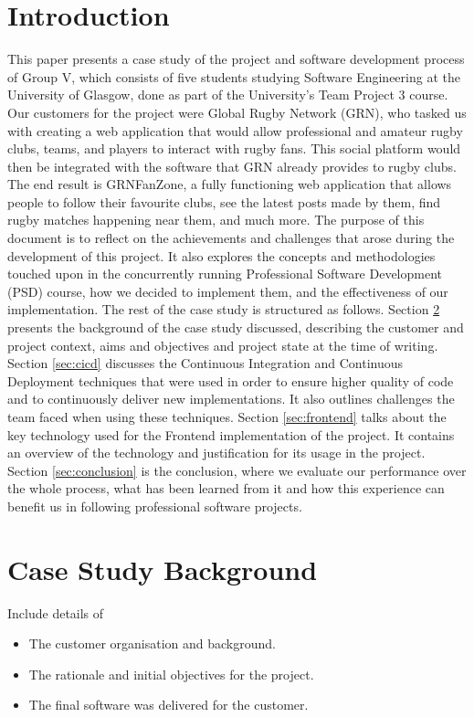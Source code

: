 \documentclass{l3proj}
\begin{document}
\section{Introduction}
This paper presents a case study of the project and software development process of Group V, which consists of five students studying Software Engineering at the University of Glasgow, done as part of the University's Team Project 3 course.
Our customers for the project were Global Rugby Network (GRN), who tasked us with creating a web application that would allow professional and amateur rugby clubs, teams, and players to interact with rugby fans. This social platform would then be integrated with the software that GRN already provides to rugby clubs. The end result is GRNFanZone, a fully functioning web application that allows people to follow their favourite clubs, see the latest posts made by them, find rugby matches happening near them, and much more.
The purpose of this document is to reflect on the achievements and challenges that arose during the development of this project. It also explores the concepts and methodologies touched upon in the concurrently running Professional Software Development (PSD) course, how we decided to implement them, and the effectiveness of our implementation.
The rest of the case study is structured as follows. 
Section \ref{sec:background} presents the background of the case study discussed, describing the customer and project context, aims and objectives and project state at the time of writing.
Section \ref{sec:cicd} discusses the Continuous Integration and Continuous Deployment techniques that were used in order to ensure higher quality of code and to continuously deliver new implementations. It also outlines challenges the team faced when using these techniques.
Section \ref{sec:frontend} talks about the key technology used for the Frontend implementation of the project. It contains an overview of the technology and justification for its usage in the project.
Section \ref{sec:conclusion} is the conclusion, where we evaluate our performance over the whole process, what has been learned from it and how this experience can benefit us in following professional software projects.
\section{Case Study Background}
\label{sec:background}
Include details of
\begin{itemize}
\item The customer organisation and background.
\item The rationale and initial objectives for the project.
\item The final software was delivered for the customer.
\end{itemize}
%
\newpage
\end{document}
